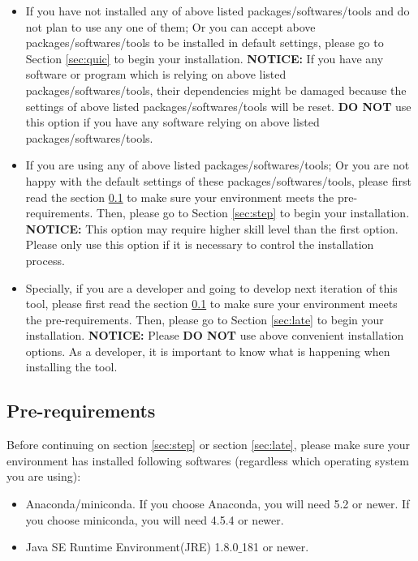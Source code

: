 \documentclass[twoside,a4paper]{refart}
\begin{document}
\begin{itemize}


\item If you have not installed any of above listed packages/softwares/tools and do not plan to use any one of them; Or you can accept above packages/softwares/tools to be installed in default settings, please go to  Section \ref{sec:quic} to begin your installation. \textbf{NOTICE:} If you have any software or program which is relying on above listed packages/softwares/tools, their dependencies might be damaged because the settings of above listed packages/softwares/tools will be reset. \textbf{DO NOT} use this option if you have any software relying on above listed packages/softwares/tools.

\item If you are using any of above listed packages/softwares/tools; Or you are not happy with the default settings of these packages/softwares/tools, please first read the  section \ref{subsec:prer} to make sure your environment meets the pre-requirements. Then, please go to  Section \ref{sec:step} to begin your installation. \textbf{NOTICE:} This option may require higher skill level than the first option. Please only use this option if it is necessary to control the installation process.

\item Specially, if you are a developer and going to develop next iteration of this tool, please first read the  section \ref{subsec:prer} to make sure your environment meets the pre-requirements. Then, please go to  Section \ref{sec:late} to begin your installation. \textbf{NOTICE:} Please \textbf{DO NOT} use above convenient installation options. As a developer, it is important to know what is happening when installing the tool.

\end{itemize}

\subsection{Pre-requirements} \label{subsec:prer}
Before continuing on section \ref{sec:step} or section \ref{sec:late}, please make sure your environment has installed following softwares (regardless which operating system you are using):

\begin{itemize}

\item Anaconda/miniconda. If you choose Anaconda, you will need 5.2 or newer. If you choose miniconda, you will need 4.5.4 or newer.

\item Java SE Runtime Environment(JRE) 1.8.0$\_$181 or newer.

\end{itemize}
\end{document}
